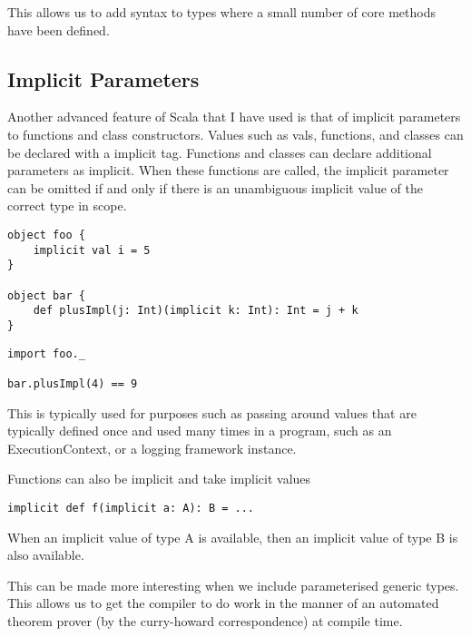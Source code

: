 \documentclass[12pt,a4paper,twoside,openright]{report}
\begin{document}
This allows us to add syntax to types where a small number of core methods have been defined.

\subsection{Implicit Parameters}
Another advanced feature of Scala that  I have used is that of implicit  parameters to functions and class constructors. Values such as vals, functions, and classes can be declared with a implicit tag. Functions and classes can declare additional parameters as implicit. When these functions are called, the implicit parameter can be omitted if and only if there is an unambiguous implicit value of the correct type in scope.
\begin{framed}
\begin{framed}
\begin{verbatim}
object foo {
    implicit val i = 5
}

object bar {
    def plusImpl(j: Int)(implicit k: Int): Int = j + k
}
\end{verbatim}
\end{framed}

\begin{framed}
\begin{verbatim}
import foo._

bar.plusImpl(4) == 9
\end{verbatim}
\end{framed}
\end{framed}
This is typically used for purposes such as passing around values that are typically defined once and used many times in a program, such as an ExecutionContext, or a logging framework instance.

Functions can also be implicit and take implicit values
\begin{framed}
\begin{verbatim}
implicit def f(implicit a: A): B = ...
\end{verbatim}
When an implicit value of type A is available, then an implicit value of type B is also available.
\end{framed}

This can be made more interesting when we include parameterised generic types. This allows us to get the compiler to do work in the manner of an automated theorem prover (by the curry-howard correspondence) at compile time.
\end{document}

